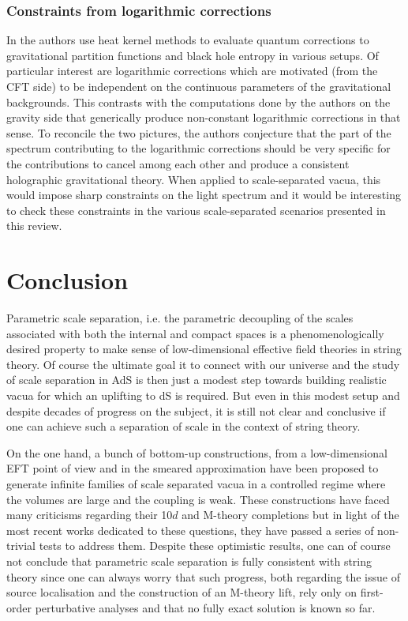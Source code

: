 \documentclass[11pt, a4paper]{article}
\begin{document}
\subsubsection{Constraints from logarithmic corrections}

In \cite{Bobev:2023dwx} the authors use heat kernel methods to evaluate quantum corrections to gravitational partition functions and black hole entropy in various setups. Of particular interest are logarithmic corrections which are motivated (from the CFT side) to be independent on the continuous parameters of the gravitational backgrounds. This contrasts with the computations done by the authors on the gravity side that generically produce non-constant logarithmic corrections in that sense. To reconcile the two pictures, the authors conjecture that the part of the spectrum contributing to the logarithmic corrections should be very specific for the contributions to cancel among each other and produce a consistent holographic gravitational theory. When applied to scale-separated vacua, this would impose sharp constraints on the light spectrum and it would be interesting to check these constraints in the various scale-separated scenarios presented in this review.

\section{Conclusion}
\label{sec:conclusion}

Parametric scale separation, i.e. the parametric decoupling of the scales associated with both the internal and compact spaces is a phenomenologically desired property to make sense of low-dimensional effective field theories in string theory. Of course the ultimate goal it to connect with our universe and the study of scale separation in AdS is then just a modest step towards building realistic vacua for which an uplifting to dS is required. But even in this modest setup and despite decades of progress on the subject, it is still not clear and conclusive if one can achieve such a separation of scale in the context of string theory.

On the one hand, a bunch of bottom-up constructions, from a low-dimensional EFT point of view and in the smeared approximation have been proposed to generate infinite families of scale separated vacua in a controlled regime where the volumes are large and the coupling is weak. These constructions have faced many criticisms regarding their 10$d$ and M-theory completions but in light of the most recent works dedicated to these questions, they have passed a series of non-trivial tests to address them. Despite these optimistic results, one can of course not conclude that parametric scale separation is fully consistent with string theory since one can always worry that such progress, both regarding the issue of source localisation and the construction of an M-theory lift, rely only on first-order perturbative analyses and that no fully exact solution is known so far.
\end{document}
